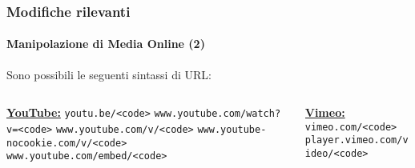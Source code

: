 \begin{frame}[fragile]
	\frametitle{Modifiche rilevanti}
	\framesubtitle{Manipolazione di Media Online (2)}

	Sono possibili le seguenti sintassi di URL:
	\vspace{0.4cm}

	\begin{columns}[T]
		\begin{column}{.52\textwidth}
			\smaller
				\tabto{0.2cm}\textbf{\underline{YouTube:}}\newline
				\tabto{0.2cm}\texttt{youtu.be/<code>}\newline
				\tabto{0.2cm}\texttt{www.youtube.com/watch?v=<code>}\newline
				\tabto{0.2cm}\texttt{www.youtube.com/v/<code>}\newline
				\tabto{0.2cm}\texttt{www.youtube-nocookie.com/v/<code>}\newline
				\tabto{0.2cm}\texttt{www.youtube.com/embed/<code>}\newline
		\end{column}
		\begin{column}{.48\textwidth}
			\vspace{-0.25cm}\smaller
				\textbf{\underline{Vimeo:}}\newline
				\texttt{vimeo.com/<code>}\newline
				\texttt{player.vimeo.com/video/<code>}\newline
		\end{column}
	\end{columns}

\end{frame}


